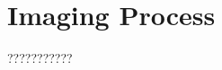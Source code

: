 \begin{figure}[H]
  \newcommand*\FigVSkip{0.5em}
  \newcommand*\FigHSkip{0.1em}
  \newsavebox\FigBox
  \centering
  \begin{minipage}{\wd\FigBox}
    \centering\usebox{\FigBox}
  \end{minipage}
  \begin{minipage}{\wd\FigBox}
    \centering\usebox{\FigBox}
  \end{minipage}\hspace*{\FigHSkip}
  \label{head}
\end{figure}

\vspace{1.3cm}
\section{Imaging Process}
???????????

